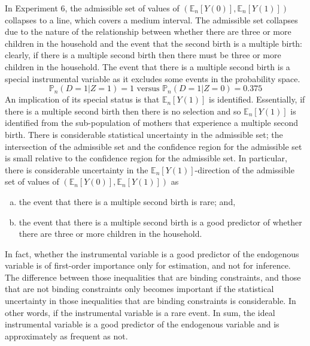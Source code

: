 \documentclass[10pt,a4paper,twoside]{article}
\numberwithin{equation}{section}
\begin{document}
In Experiment 6, the admissible set of values of $(\mathbb{E}_n[Y(0)],\mathbb{E}_n[Y(1)])$ collapses to a line, which covers a medium interval. The admissible set collapses due to the nature of the relationship between whether there are three or more children in the household and the event that the second birth is a multiple birth: clearly, if there is a multiple second birth then there must be three or more children in the household. The event that there is a multiple second birth is a special instrumental variable as it excludes some events in the probability space.
\[\mathbb{P}_n(D=1|Z=1)=1\text{ versus }\mathbb{P}_n(D=1|Z=0)=0.375\]
An implication of its special status is that $\mathbb{E}_n[Y(1)]$ is identified. Essentially, if there is a multiple second birth then there is no selection and so $\mathbb{E}_n[Y(1)]$ is identified from the sub-population of mothers that experience a multiple second birth. There is considerable statistical uncertainty in the admissible set; the intersection of the admissible set and the confidence region for the admissible set is small relative to the confidence region for the admissible set. In particular, there is considerable uncertainty in the $\mathbb{E}_n[Y(1)]$-direction of the admissible set of values of $(\mathbb{E}_n[Y(0)],\mathbb{E}_n[Y(1)])$ as
\begin{enumerate}[(a)]
\item the event that there is a multiple second birth is rare; and,
\item the event that there is a multiple second birth is a good predictor of whether there are three or more children in the household.
\end{enumerate}  

In fact, whether the instrumental variable is a good predictor of the endogenous variable is of first-order importance only for estimation, and not for inference. The difference between those inequalities that are binding constraints, and those that are not binding constraints only becomes important if the statistical uncertainty in those inequalities that are binding constraints is considerable. In other words, if the instrumental variable is a rare event. In sum, the ideal instrumental variable is a good predictor of the endogenous variable and is approximately as frequent as not.  
\end{document}
